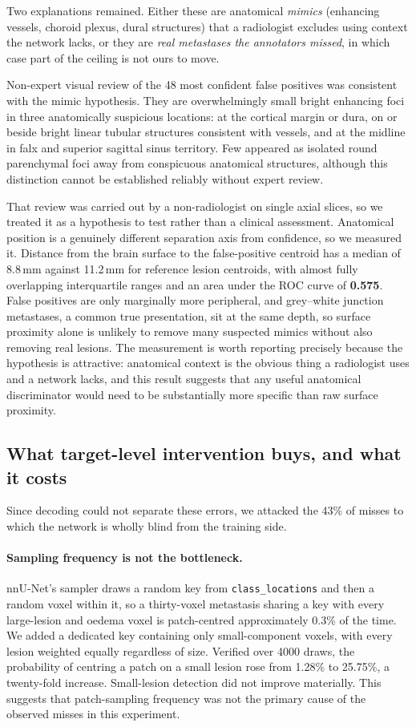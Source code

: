\documentclass[runningheads]{llncs}
\begin{document}
Two explanations remained. Either these are anatomical \emph{mimics} (enhancing vessels, choroid
plexus, dural structures) that a radiologist excludes using context the network lacks, or they
are \emph{real metastases the annotators missed}, in which case part of the ceiling is not ours
to move.

Non-expert visual review of the 48 most confident false positives was consistent with the mimic hypothesis. They are
overwhelmingly small bright enhancing foci in three anatomically suspicious locations: at the
cortical margin or dura, on or beside bright linear tubular structures consistent with vessels,
and at the midline in falx and superior sagittal sinus territory. Few appeared as isolated round parenchymal foci away from conspicuous anatomical structures,
although this distinction cannot be established reliably without expert review.

That review was carried out by a non-radiologist on single axial slices, so we treated it as a
hypothesis to test rather than a clinical assessment. Anatomical position is a genuinely
different separation axis from confidence, so we measured it. Distance from the brain surface to the false-positive
centroid has a median of 8.8\,mm against 11.2\,mm for reference lesion centroids, with almost
fully overlapping interquartile ranges and an area under the ROC curve of \textbf{0.575}. False
positives are only marginally more peripheral, and grey--white junction metastases, a common
true presentation, sit at the same depth, so surface proximity alone is unlikely to remove many suspected mimics without also removing real lesions. The measurement is worth reporting precisely because the
hypothesis is attractive: anatomical context is the obvious thing a radiologist uses and a network
lacks, and this result suggests that any useful anatomical discriminator would need to be substantially more
specific than raw surface proximity.

\subsection{What target-level intervention buys, and what it costs}

Since decoding could not separate these errors, we attacked the 43\% of misses to which the
network is wholly blind from the training side.

\paragraph{Sampling frequency is not the bottleneck.} nnU-Net's sampler draws a random key from
\texttt{class\_locations} and then a random voxel within it, so a thirty-voxel metastasis sharing
a key with every large-lesion and oedema voxel is patch-centred approximately 0.3\% of the time.
We added a dedicated key containing only small-component voxels, with every lesion weighted
equally regardless of size. Verified over 4000 draws, the probability of centring a patch on a
small lesion rose from 1.28\% to 25.75\%, a twenty-fold increase. Small-lesion detection did not improve materially. This suggests that patch-sampling frequency was
not the primary cause of the observed misses in this experiment.
\end{document}
